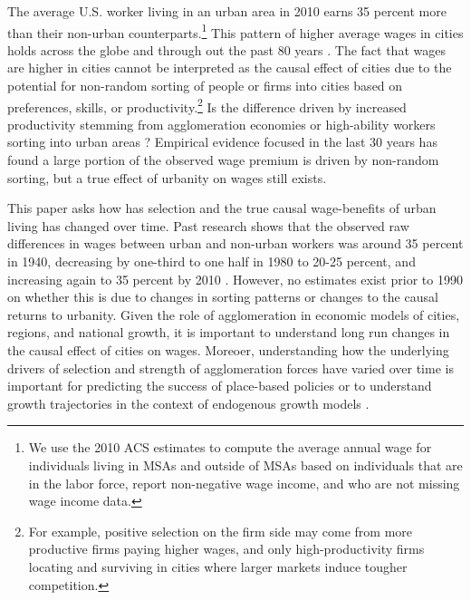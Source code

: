 \documentclass[12pt]{article}
\begin{document}
The average U.S. worker living in an urban area in 2010 earns 35 percent more than their non-urban counterparts.\footnote{
We use the 2010 ACS estimates to compute the average annual wage for individuals living in MSAs and outside of MSAs based on individuals that are in the labor force, report non-negative wage income, and who are not missing wage income data.} 
This pattern of higher average wages in cities holds across the globe and through out the past 80 years \citep{Boustan_Bunten_Hearey_2013}.
The fact that wages are higher in cities cannot be interpreted as the causal effect of cities due to the potential for non-random sorting of people or firms into cities based on preferences, skills, or productivity.\footnote{
For example, positive selection on the firm side may come from more productive firms paying higher wages, and only high-productivity firms locating and surviving in cities where larger markets induce tougher competition.} 
Is the difference driven by increased productivity stemming from agglomeration economies or high-ability workers sorting into urban areas \citep*[e.g.][]{behrens2014productive,moretti2011handbook,puga2010magnitude}?
Empirical evidence focused in the last 30 years has found a large portion of the observed wage premium is driven by non-random sorting, but a true effect of urbanity on wages still exists.

This paper asks how has selection and the true causal wage-benefits of urban living has changed over time. 
Past research shows that the observed raw differences in wages between urban and non-urban workers was around 35 percent in 1940, decreasing by one-third to one half in 1980 to 20-25 percent, and increasing again to 35 percent by 2010 \citep*{dauth2022matching,Boustan_Bunten_Hearey_2013}. 
However, no estimates exist prior to 1990 on whether this is due to changes in sorting patterns or changes to the causal returns to urbanity.
Given the role of agglomeration in economic models of cities, regions, and national growth, it is important to understand long run changes in the causal effect of cities on wages. 
Moreoer, understanding how the underlying drivers of selection and strength of agglomeration forces have varied over time is important for predicting the success of place-based policies \citep[e.g.][]{kerr2020tech} or to understand growth trajectories in the context of endogenous growth models \citep[e.g.][]{martin2001growth}. 
\end{document}
